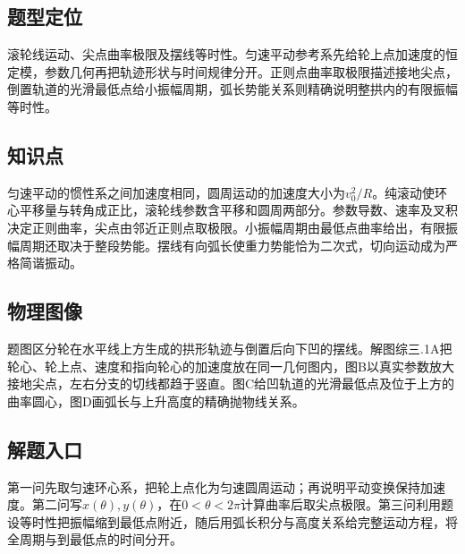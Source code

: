 \documentclass[UTF8,fontset=fandol,a4paper,11pt]{ctexart}
\begin{document}
\subsection*{题型定位}

滚轮线运动、尖点曲率极限及摆线等时性。匀速平动参考系先给轮上点加速度的恒定模，参数几何再把轨迹形状与时间规律分开。正则点曲率取极限描述接地尖点，倒置轨道的光滑最低点给小振幅周期，弧长势能关系则精确说明整拱内的有限振幅等时性。



\subsection*{知识点}

匀速平动的惯性系之间加速度相同，圆周运动的加速度大小为$v_0^2/R$。纯滚动使环心平移量与转角成正比，滚轮线参数含平移和圆周两部分。参数导数、速率及叉积决定正则曲率，尖点由邻近正则点取极限。小振幅周期由最低点曲率给出，有限振幅周期还取决于整段势能。摆线有向弧长使重力势能恰为二次式，切向运动成为严格简谐振动。



\subsection*{物理图像}

题图区分轮在水平线上方生成的拱形轨迹与倒置后向下凹的摆线。解图综三.1A把轮心、轮上点、速度和指向轮心的加速度放在同一几何图内，图B以真实参数放大接地尖点，左右分支的切线都趋于竖直。图C给凹轨道的光滑最低点及位于上方的曲率圆心，图D画弧长与上升高度的精确抛物线关系。



\subsection*{解题入口}

第一问先取匀速环心系，把轮上点化为匀速圆周运动；再说明平动变换保持加速度。第二问写$x(\theta),y(\theta)$，在$0<\theta<2\pi$计算曲率后取尖点极限。第三问利用题设等时性把振幅缩到最低点附近，随后用弧长积分与高度关系给完整运动方程，将全周期与到最低点的时间分开。


\end{document}
